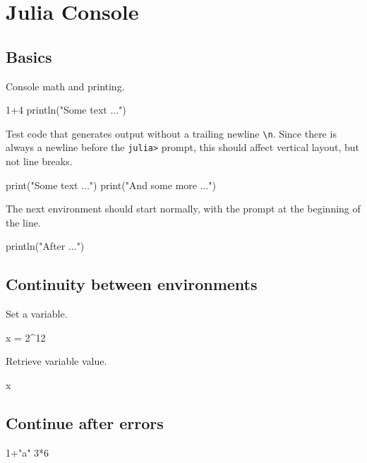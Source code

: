 \documentclass[11pt]{article}
\begin{document}
\section*{Julia Console}


\subsection*{Basics}

Console math and printing.

\begin{juliaconsole}
1+4
println("Some text ...")
\end{juliaconsole}

Test code that generates output without a trailing newline \verb|\n|.  Since there is always a newline before the \verb|julia>| prompt, this should affect vertical layout, but not line breaks.
\begin{juliaconsole}
print("Some text ...")
print("And some more ...")
\end{juliaconsole}

The next environment should start normally, with the prompt at the beginning of the line.
\begin{juliaconsole}
println("After ...")
\end{juliaconsole}



\subsection*{Continuity between environments}

Set a variable.
\begin{juliaconsole}
x = 2^12
\end{juliaconsole}

Retrieve variable value.
\begin{juliaconsole}
x
\end{juliaconsole}


\subsection*{Continue after errors}

\begin{juliaconsole}[][breaklines]
1+"a"
3*6
\end{juliaconsole}
\end{document}
